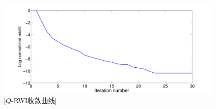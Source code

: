 \begin{figure}[!htbp]
    \centering
    {\includegraphics[width=1.0\linewidth]{figure/misfit}}
    [$Q$-RWI收敛曲线]
    \label{fig:misfit_model}
\end{figure}

